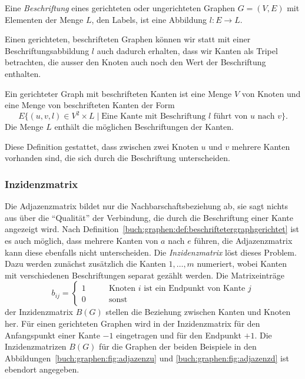 \begin{definition}
Eine {\em Beschriftung}
eines gerichteten oder ungerichteten Graphen $G=(V,E)$ 
mit Elementen der Menge $L$, den Labels,
ist eine Abbildung $l\colon E\to L$.
%
\end{definition}

Einen gerichteten, beschrifteten Graphen können wir 
statt mit einer Beschriftungsabbildung $l$ auch dadurch erhalten,
dass wir Kanten als Tripel betrachten, die ausser den Knoten auch
noch den Wert der Beschriftung enthalten.

\begin{definition}
\label{buch:graphen:def:beschriftetergraphgerichtet}
Ein gerichteter Graph mit beschrifteten Kanten ist eine Menge $V$ von 
Knoten und eine Menge von beschrifteten Kanten der Form
\[
E \{ (u,v,l)\in V^2\times L\;|\; \text{Eine Kante mit Beschriftung $l$ führt von $u$ nach $v$}\}.
\]
Die Menge $L$ enthält die möglichen Beschriftungen der Kanten.
\end{definition}

Diese Definition gestattet, dass zwischen zwei Knoten $u$ und $v$
mehrere Kanten vorhanden sind, die sich durch die Beschriftung
unterscheiden.

\subsubsection{Inzidenzmatrix}
Die Adjazenzmatrix bildet nur die Nachbarschaftsbeziehung ab,
sie sagt nichts aus über die ``Qualität'' der Verbindung, die durch
die Beschriftung einer Kante angezeigt wird.
Nach Definition~\ref{buch:graphen:def:beschriftetergraphgerichtet}
ist es auch möglich, dass mehrere Kanten von $a$ nach $e$ führen,
die Adjazenzmatrix kann diese ebenfalls nicht unterscheiden.
Die {\em Inzidenzmatrix}
löst dieses Problem.
%
Dazu werden zunächst zusätzlich die Kanten $1,\dots,m$
numeriert, wobei Kanten mit verschiedenen Beschriftungen separat
gezählt werden.
Die Matrixeinträge
\[
b_{i\!j} = \begin{cases}
1\qquad&\text{Knoten $i$ ist ein Endpunkt von Kante $j$}
\\
0\qquad&\text{sonst}
\end{cases}
\]
der Inzidenzmatrix $B(G)$
stellen die Beziehung zwischen Kanten und Knoten her.
Für einen gerichteten Graphen wird in der Inzidenzmatrix für
den Anfangspunkt einer Kante $-1$ eingetragen und für den
Endpunkt $+1$.
Die Inzidenzmatrizen $B(G)$ für die Graphen der beiden Beispiele
in den Abbildungen~\ref{buch:graphen:fig:adjazenzu} und
\ref{buch:graphen:fig:adjazenzd} ist ebendort angegeben.


